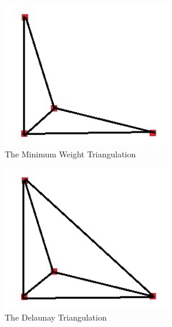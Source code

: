 \documentclass[11pt,psfig]{article}
\begin{document}
\begin{figure}[H]
\centering
\includegraphics[height=2.5in]{hw7prob3diagram2.jpg}
\caption{The Minimum Weight Triangulation}
\end{figure}

\begin{figure}[H]
\centering
\includegraphics[height=2.5in]{hw7prob3diagram3.jpg}
\caption{The Delaunay Triangulation}
\end{figure}
\end{document}
